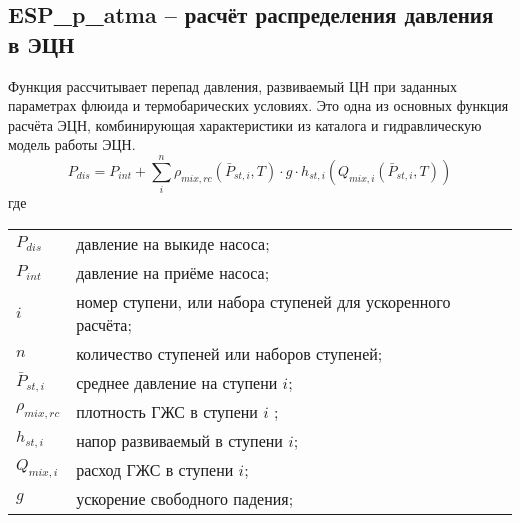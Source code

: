 \subsection{ESP\_p\_atma – расчёт распределения давления в ЭЦН}
Функция рассчитывает перепад давления, развиваемый ЦН при заданных параметрах флюида и термобарических условиях. Это одна из основных функция расчёта ЭЦН, комбинирующая характеристики из каталога и гидравлическую модель работы ЭЦН.
$$ P_{dis} = P_{int} + \sum_i^n{\rho_{mix,rc}(\bar{P}_{st,i},T) \cdot g \cdot h_{st,i}(Q_{mix,i}(\bar{P}_{st,i},T))} $$
где 


		
\begin{tabular}{p{}p{}}
	
$P_{dis}$ & давление на выкиде насоса; \\
$P_{int}$ & давление на приёме насоса; \\
$i$ & номер ступени, или набора ступеней для ускоренного расчёта; \\
$n$ & количество ступеней или наборов ступеней; \\
$\bar{P}_{st,i}$ & среднее давление на  ступени $i$; \\
$\rho_{mix,rc}$ & плотность ГЖС  в ступени $i$ ; \\
$h_{st,i}$ & напор развиваемый  в ступени $i$; \\
$Q_{mix,i}$ & расход ГЖС в ступени $i$; \\
$g$ & ускорение свободного падения; \\ 

\end{tabular}


